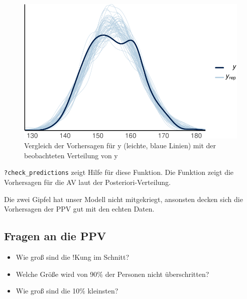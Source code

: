 \documentclass[
  a4paper,
  DIV=11]{scrreprt}
\providecommand{\tightlist}{%
  \setlength{\itemsep}{0pt}\setlength{\parskip}{0pt}}\usepackage{longtable,booktabs,array}
\theoremstyle{definition}
\theoremstyle{remark}
\begin{document}
\begin{figure}[H]

{\centering \includegraphics{./lineare-modelle_files/figure-pdf/fig-ppv-check-1.pdf}

}

\caption{\label{fig-ppv-check}Vergleich der Vorhersagen für y (leichte,
blaue Linien) mit der beobachteten Verteilung von y}

\end{figure}

\texttt{?check\_predictions} zeigt Hilfe für diese Funktion. Die
Funktion zeigt die Vorhersagen für die AV laut der
Posteriori-Verteilung.

Die zwei Gipfel hat unser Modell nicht mitgekriegt, ansonsten decken
sich die Vorhersagen der PPV gut mit den echten Daten.

\hypertarget{fragen-an-die-ppv}{%
\subsection{Fragen an die PPV}\label{fragen-an-die-ppv}}

\begin{itemize}
\tightlist
\item
  Wie groß sind die !Kung im Schnitt?
\item
  Welche Größe wird von 90\% der Personen nicht überschritten?
\item
  Wie groß sind die 10\% kleinsten?
\end{itemize}
\end{document}
